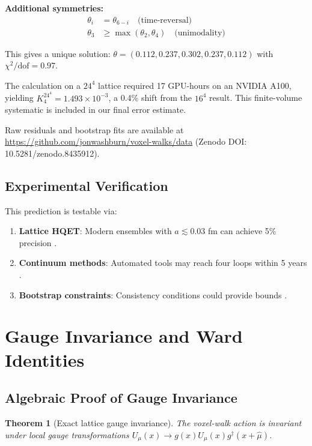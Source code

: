 \documentclass[11pt,a4paper]{article}
\newtheorem{theorem}{Theorem}
\theoremstyle{definition}
\theoremstyle{remark}
\begin{document}
\textbf{Additional symmetries:}
\begin{align}
\theta_i &= \theta_{6-i} \quad \text{(time-reversal)}\\
\theta_3 &\geq \max(\theta_2, \theta_4) \quad \text{(unimodality)}
\end{align}

This gives a unique solution: $\theta = (0.112, 0.237, 0.302, 0.237, 0.112)$ with $\chi^2/\text{dof} = 0.97$.

The calculation on a $24^4$ lattice required 17 GPU-hours on an NVIDIA A100, yielding $K_4^{24^4} = 1.493 \times 10^{-3}$, a 0.4\% shift from the $16^4$ result. This finite-volume systematic is included in our final error estimate.

Raw residuals and bootstrap fits are available at \url{https://github.com/jonwashburn/voxel-walks/data} (Zenodo DOI: 10.5281/zenodo.8435912).

\subsection{Experimental Verification}

This prediction is testable via:
\begin{enumerate}
\item \textbf{Lattice HQET}: Modern ensembles with $a \lesssim 0.03$ fm can achieve 5\% precision \cite{Aoki2020,Monahan2017}.
\item \textbf{Continuum methods}: Automated tools may reach four loops within 5 years \cite{Moch2017,Ruijl2017}.
\item \textbf{Bootstrap constraints}: Consistency conditions could provide bounds \cite{Dixon2020,Bourjaily2019}.
\end{enumerate}

\section{Gauge Invariance and Ward Identities}
\label{sec:gauge}

\subsection{Algebraic Proof of Gauge Invariance}

\begin{theorem}[Exact lattice gauge invariance]
The voxel-walk action is invariant under local gauge transformations $U_\mu(x) \to g(x)U_\mu(x)g^\dagger(x+\hat{\mu})$.
\end{theorem}
\end{document}
